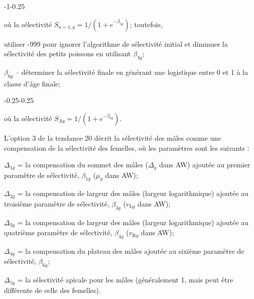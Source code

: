 \documentclass[11pt]{book}
\begin{document}
\begin{enumerate_itemize}{}{}
    \begin{enumerate_itemize}{-1}{-0.25}
      \item o\`{u} la s\'{e}lectivit\'{e} $S_{a{=}1,g} = 1/(1+e^{-\beta_{5g}})$; toutefois,
      \item utiliser -999 pour ignorer l'algorithme de s\'{e}lectivit\'{e} initial et diminuer la s\'{e}lectivit\'{e} des petits poissons en utilisant $\beta_{3g}$;
    \end{enumerate_itemize}
  \item $\beta_{6g}$ -- d\'{e}terminer la s\'{e}lectivit\'{e} finale en g\'{e}n\'{e}rant une logistique entre 0 et 1 \`{a} la classe d'\^{a}ge finale;
    \begin{enumerate_itemize}{-0.25}{-0.25}
      \item o\`{u} la s\'{e}lectivit\'{e} $S_{Ag} = 1/(1+e^{-\beta_{6g}})$.
    \end{enumerate_itemize}
\end{enumerate_itemize}

L'option 3 de la tendance 20 d\'{e}crit la s\'{e}lectivit\'{e} des m\^{a}les comme une compensation de la s\'{e}lectivit\'{e} des femelles, o\`{u} les param\`{e}tres sont les suivants :
\begin{enumerate_csas}{}{}
\item $\Delta_{1g}$ = la compensation du sommet des m\^{a}les ($\Delta_g$ dans AW) ajout\'{e}e au premier param\`{e}tre de s\'{e}lectivit\'{e}, $\beta_{1g}$ ($\mu_g$ dans AW);
\item $\Delta_{2g}$ = la compensation de largeur des m\^{a}les (largeur logarithmique) ajout\'{e}e au troisi\`{e}me param\`{e}tre de s\'{e}lectivit\'{e}, $\beta_{3g}$ ($v_{\text{L}g}$ dans AW);
\item $\Delta_{3g}$ = la compensation de largeur des m\^{a}les (largeur logarithmique) ajout\'{e}e au quatri\`{e}me param\`{e}tre de s\'{e}lectivit\'{e}, $\beta_{4g}$ ($v_{\text{R}g}$ dans AW);
\item $\Delta_{4g}$ = la compensation du plateau des m\^{a}les ajout\'{e}e au sixi\`{e}me param\`{e}tre de s\'{e}lectivit\'{e}, $\beta_{6g}$;
\item $\Delta_{5g}$ = la s\'{e}lectivit\'{e} apicale pour les m\^{a}les (g\'{e}n\'{e}ralement 1, mais peut \^{e}tre diff\'{e}rente de celle des femelles).
\end{enumerate_csas}
\end{document}

